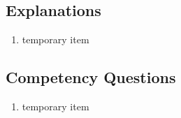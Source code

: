 \subsection{Explanations}
\label{exp:GeoSPARQL}
\begin{enumerate}
\item temporary item
\end{enumerate}

\subsection{Competency Questions}
\label{cqs:GeoSPARQL}
\begin{enumerate}[CQ1.]
\item temporary item
\end{enumerate}

\newpage
